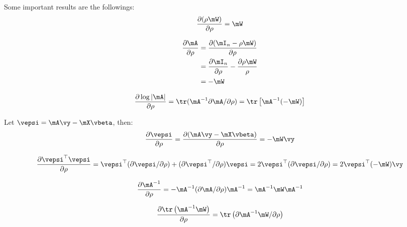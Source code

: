 \begin{definition}\label{definition:matrix_cal_sar}
Some important results  are the followings:
\begin{equation}\label{eq:mc_1}
\frac{\partial (\rho \mW)}{\partial \rho} = \mW
\end{equation}

\begin{equation}\label{eq:mc_2}
  \begin{aligned}
\frac{\partial \mA}{\partial \rho} & = \frac{\partial (\mI_n - \rho\mW)}{\partial \rho} \\
                                   & = \frac{\partial \mI_n}{\partial \rho} - \frac{\partial \rho\mW}{\rho} \\
                                   & = -\mW
 \end{aligned}
\end{equation}

\begin{equation}\label{eq:mc_3}
\frac{\partial \log \left|\mA\right|}{\partial \rho}  = \tr(\mA^{-1}\partial \mA / \partial \rho) = \tr\left[\mA^{-1}(-\mW)\right]
\end{equation}

Let $\vepsi = \mA\vy - \mX\vbeta$, then:
\begin{equation}\label{eq:mc_4}
  \frac{\partial \vepsi}{\partial \rho} =  \frac{\partial (\mA\vy - \mX\vbeta)}{\partial \rho} = -\mW\vy 
\end{equation}

\begin{equation}\label{eq:mc_5}
  \frac{\partial \vepsi^\top \vepsi}{\partial \rho} = \vepsi^\top (\partial \vepsi / \partial \rho) + (\partial \vepsi ^\top / \partial \rho)\vepsi = 2\vepsi^\top (\partial \vepsi / \partial \rho) = 2\vepsi^\top(-\mW)\vy
\end{equation}

\begin{equation}\label{eq:mc_6}
  \frac{\partial \mA^{-1}}{\partial \rho} = -\mA^{-1}(\partial \mA / \partial \rho)\mA^{-1} = \mA^{-1} \mW \mA^{-1}
\end{equation}

\begin{equation}\label{eq:mc_7}
  \frac{\partial \tr\left(\mA^{-1} \mW\right)}{\partial \rho} = \tr\left(\partial \mA^{-1}\mW / \partial \rho\right) 
\end{equation}
\end{definition}


